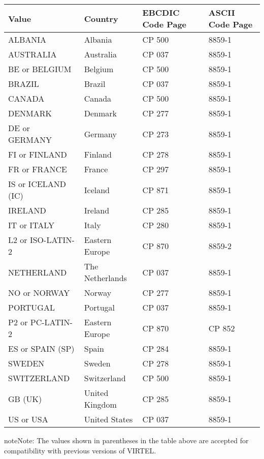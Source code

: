 \documentclass[letterpaper,10pt,english]{sphinxmanual}
\begin{document}
\begin{savenotes}\sphinxattablestart
\centering
\begin{tabulary}{\linewidth}[t]{|T|T|T|T|}
\hline
\sphinxstyletheadfamily 
Value
&\sphinxstyletheadfamily 
Country
&\sphinxstyletheadfamily 
EBCDIC Code Page
&\sphinxstyletheadfamily 
ASCII Code Page
\\
\hline
ALBANIA
&
Albania
&
CP 500
&
8859-1
\\
\hline
AUSTRALIA
&
Australia
&
CP 037
&
8859-1
\\
\hline
BE or BELGIUM
&
Belgium
&
CP 500
&
8859-1
\\
\hline
BRAZIL
&
Brazil
&
CP 037
&
8859-1
\\
\hline
CANADA
&
Canada
&
CP 500
&
8859-1
\\
\hline
DENMARK
&
Denmark
&
CP 277
&
8859-1
\\
\hline
DE or GERMANY
&
Germany
&
CP 273
&
8859-1
\\
\hline
FI or FINLAND
&
Finland
&
CP 278
&
8859-1
\\
\hline
FR or FRANCE
&
France
&
CP 297
&
8859-1
\\
\hline
IS or ICELAND (IC)
&
Iceland
&
CP 871
&
8859-1
\\
\hline
IRELAND
&
Ireland
&
CP 285
&
8859-1
\\
\hline
IT or ITALY
&
Italy
&
CP 280
&
8859-1
\\
\hline
L2 or ISO-LATIN-2
&
Eastern Europe
&
CP 870
&
8859-2
\\
\hline
NETHERLAND
&
The Netherlands
&
CP 037
&
8859-1
\\
\hline
NO or NORWAY
&
Norway
&
CP 277
&
8859-1
\\
\hline
PORTUGAL
&
Portugal
&
CP 037
&
8859-1
\\
\hline
P2 or PC-LATIN-2
&
Eastern Europe
&
CP 870
&
CP 852
\\
\hline
ES or SPAIN (SP)
&
Spain
&
CP 284
&
8859-1
\\
\hline
SWEDEN
&
Sweden
&
CP 278
&
8859-1
\\
\hline
SWITZERLAND
&
Switzerland
&
CP 500
&
8859-1
\\
\hline
GB (UK)
&
United Kingdom
&
CP 285
&
8859-1
\\
\hline
US or USA
&
United States
&
CP 037
&
8859-1
\\
\hline
\end{tabulary}
\par
\sphinxattableend\end{savenotes}

\begin{sphinxadmonition}{note}{Note:}
The values shown in parentheses in the table above are accepted for compatibility with previous versions of VIRTEL.
\end{sphinxadmonition}
\end{document}
